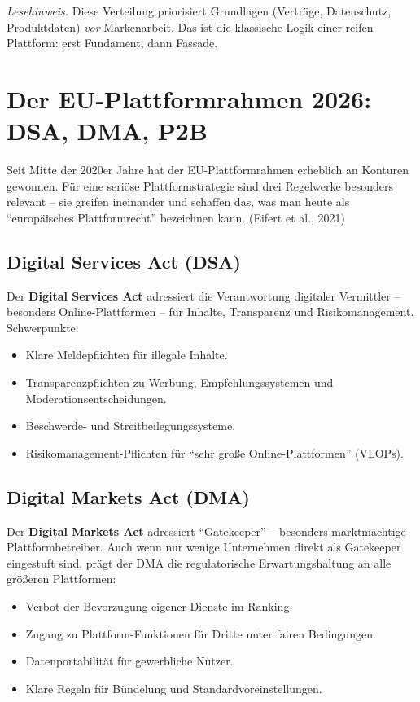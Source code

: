 \documentclass[11pt,a4paper,oneside]{article}
\newcommand{\fachbegriff}[1]{\textbf{#1}}
\newcommand{\quelle}[1]{{\footnotesize\color{lpGray}(#1)}}
\begin{document}
\medskip

\noindent\emph{Lesehinweis.} Diese Verteilung priorisiert Grundlagen (Verträge, Datenschutz, Produktdaten) \emph{vor} Markenarbeit. Das ist die klassische Logik einer reifen Plattform: erst Fundament, dann Fassade.

\section{Der EU-Plattformrahmen 2026: DSA, DMA, P2B}

Seit Mitte der 2020er Jahre hat der EU-Plattformrahmen erheblich an Konturen gewonnen. Für eine seriöse Plattformstrategie sind drei Regelwerke besonders relevant -- sie greifen ineinander und schaffen das, was man heute als ``europäisches Plattformrecht'' bezeichnen kann. \quelle{Eifert et al., 2021}

\subsection{Digital Services Act (DSA)}

Der \fachbegriff{Digital Services Act} adressiert die Verantwortung digitaler Vermittler -- besonders Online-Plattformen -- für Inhalte, Transparenz und Risikomanagement. Schwerpunkte:

\begin{itemize}
  \item Klare Meldepflichten für illegale Inhalte.
  \item Transparenzpflichten zu Werbung, Empfehlungssystemen und Moderationsentscheidungen.
  \item Beschwerde- und Streitbeilegungssysteme.
  \item Risikomanagement-Pflichten für ``sehr große Online-Plattformen'' (VLOPs).
\end{itemize}

\subsection{Digital Markets Act (DMA)}

Der \fachbegriff{Digital Markets Act} adressiert ``Gatekeeper'' -- besonders marktmächtige Plattformbetreiber. Auch wenn nur wenige Unternehmen direkt als Gatekeeper eingestuft sind, prägt der DMA die regulatorische Erwartungshaltung an alle größeren Plattformen:

\begin{itemize}
  \item Verbot der Bevorzugung eigener Dienste im Ranking.
  \item Zugang zu Plattform-Funktionen für Dritte unter fairen Bedingungen.
  \item Datenportabilität für gewerbliche Nutzer.
  \item Klare Regeln für Bündelung und Standardvoreinstellungen.
\end{itemize}
\end{document}
